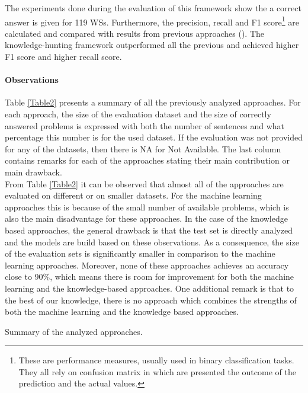  The experiments done during the evaluation of this framework show the a correct answer is given for 119 WSs. Furthermore, the precision, recall and F1 score\footnote{These are performance measures, usually used in binary classification tasks. They all rely on confusion matrix in which are presented the outcome of the prediction and the actual values.} are calculated and compared with results from previous approaches (\cite{DBLP:conf/aaai/SharmaB16, DBLP:conf/aaaiss/LiuJLZWH17}). The knowledge-hunting framework outperformed all the previous and achieved higher F1 score and higher recall score. %

\paragraph{Observations} 
Table \ref{Table2} presents a summary of all the previously analyzed approaches. For each approach, the size of the evaluation dataset and the size of correctly answered problems is expressed with both the number of sentences and what percentage this number is for the used dataset. If the evaluation was not provided for any of the datasets, then there is NA for Not Available. The last column contains remarks for each of the approaches stating their main contribution or main drawback. \\ 
From Table \ref{Table2} it can be observed that almost all of the approaches are evaluated on different or on smaller datasets. 
For the machine learning approaches this is because of the small number of available problems, which is also the main disadvantage for these approaches. 
In the case of the knowledge based approaches, the general drawback is that the test set is directly analyzed and the models are build based on these observations. As a consequence, the size of the evaluation sets is significantly smaller in comparison to the machine learning approaches. Moreover, none of these approaches achieves an accuracy close to 90\%, which means there is room for improvement for both the machine learning and the knowledge-based approaches. One additional remark is that to the best of our knowledge, there is no approach which combines the strengths of both the machine learning and the knowledge based approaches. \\


\begin{table}[h!]
	\centering
	
	\caption{{\label{Table2}}Summary of the analyzed approaches.}
\end{table}

